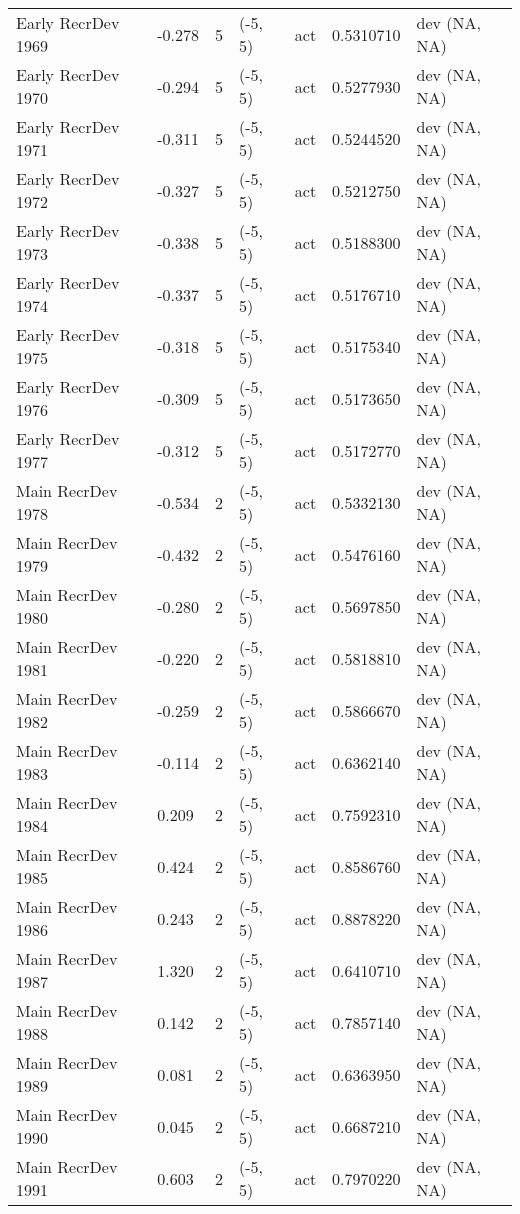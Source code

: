 \documentclass[11pt,
  english,
  a4paper,
]{article}
\begin{document}
\begin{landscape}
\begin{longtable}[t]{>{\raggedright\arraybackslash}p{6cm}lllll>{\raggedright\arraybackslash}p{4cm}}
Early RecrDev 1969 & -0.278 & 5 & (-5, 5) & act & 0.5310710 & dev (NA, NA)\\
Early RecrDev 1970 & -0.294 & 5 & (-5, 5) & act & 0.5277930 & dev (NA, NA)\\
Early RecrDev 1971 & -0.311 & 5 & (-5, 5) & act & 0.5244520 & dev (NA, NA)\\
Early RecrDev 1972 & -0.327 & 5 & (-5, 5) & act & 0.5212750 & dev (NA, NA)\\
Early RecrDev 1973 & -0.338 & 5 & (-5, 5) & act & 0.5188300 & dev (NA, NA)\\
Early RecrDev 1974 & -0.337 & 5 & (-5, 5) & act & 0.5176710 & dev (NA, NA)\\
Early RecrDev 1975 & -0.318 & 5 & (-5, 5) & act & 0.5175340 & dev (NA, NA)\\
Early RecrDev 1976 & -0.309 & 5 & (-5, 5) & act & 0.5173650 & dev (NA, NA)\\
Early RecrDev 1977 & -0.312 & 5 & (-5, 5) & act & 0.5172770 & dev (NA, NA)\\
Main RecrDev 1978 & -0.534 & 2 & (-5, 5) & act & 0.5332130 & dev (NA, NA)\\
Main RecrDev 1979 & -0.432 & 2 & (-5, 5) & act & 0.5476160 & dev (NA, NA)\\
Main RecrDev 1980 & -0.280 & 2 & (-5, 5) & act & 0.5697850 & dev (NA, NA)\\
Main RecrDev 1981 & -0.220 & 2 & (-5, 5) & act & 0.5818810 & dev (NA, NA)\\
Main RecrDev 1982 & -0.259 & 2 & (-5, 5) & act & 0.5866670 & dev (NA, NA)\\
Main RecrDev 1983 & -0.114 & 2 & (-5, 5) & act & 0.6362140 & dev (NA, NA)\\
Main RecrDev 1984 & 0.209 & 2 & (-5, 5) & act & 0.7592310 & dev (NA, NA)\\
Main RecrDev 1985 & 0.424 & 2 & (-5, 5) & act & 0.8586760 & dev (NA, NA)\\
Main RecrDev 1986 & 0.243 & 2 & (-5, 5) & act & 0.8878220 & dev (NA, NA)\\
Main RecrDev 1987 & 1.320 & 2 & (-5, 5) & act & 0.6410710 & dev (NA, NA)\\
Main RecrDev 1988 & 0.142 & 2 & (-5, 5) & act & 0.7857140 & dev (NA, NA)\\
Main RecrDev 1989 & 0.081 & 2 & (-5, 5) & act & 0.6363950 & dev (NA, NA)\\
Main RecrDev 1990 & 0.045 & 2 & (-5, 5) & act & 0.6687210 & dev (NA, NA)\\
Main RecrDev 1991 & 0.603 & 2 & (-5, 5) & act & 0.7970220 & dev (NA, NA)\\

\end{longtable}
\end{landscape}
\end{document}

